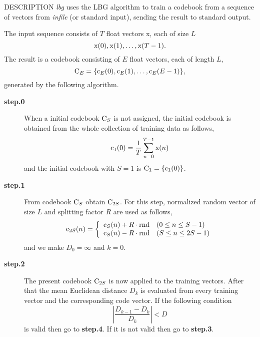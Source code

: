 \begin{qsection}{DESCRIPTION}
{\em lbg} uses the LBG algorithm to train a codebook 
from a sequence of vectors from {\em infile} (or standard input), 
sending the result to standard output.

The input sequence consists of $T$ float vectors {\boldmath x}, 
each of size $L$
\begin{displaymath} 
\mbox{\boldmath x}(0), \mbox{\boldmath x}(1), \ldots, \mbox{\boldmath x}(T-1). 
\end{displaymath}
The result is a codebook consisting of $E$ float vectors, 
each of length $L$,
\begin{displaymath}
\mbox{\boldmath C}_E =\{ \mbox{\boldmath c}_E(0), \mbox{\boldmath c}_E(1), 
\ldots, \mbox{\boldmath c}_E(E-1) \}, 
\end{displaymath}
generated by the following algorithm.

\begin{description}
\item[\bf step.0~~~]
When a initial codebook $\mbox{\boldmath C}_S$ is not assigned,
the initial codebook is obtained from the whole collection of
training data as follows,
\begin{displaymath}
\mbox{\boldmath c}_1(0) = \frac{1}{T} \sum_{n=0}^{T-1} \mbox{\boldmath x}(n)
\end{displaymath}
and the initial codebook with $S = 1$ is $\mbox{\boldmath C}_1 = \{ \mbox{\boldmath c}_1(0) \}$.

\item[\bf step.1~~~]
From codebook $\mbox{\boldmath C}_{S}$ obtain $\mbox{\boldmath C}_{2S}$.
For this step, normalized random vector of size $L$ and splitting factor
$R$ are used as follows,
\begin{displaymath}
\mbox{\boldmath c}_{2S}(n)=\left\{ \begin{array}{ll}
\mbox{\boldmath c}_S(n) + R \cdot \mbox{\boldmath rnd} & ( 0 \le n \le S-1 ) \\
\mbox{\boldmath c}_S(n) - R \cdot \mbox{\boldmath rnd} & ( S \le n \le 2S-1 )
\end{array}\right.
\end{displaymath}
and we make $D_0 = \infty$ and $k = 0$.

\item[\bf step.2~~~]
The present codebook $\mbox{\boldmath C}_{2S}$ is now applied
to the training vectors.
After that the mean Euclidean distance $D_k$ is evaluated
from every training vector and the corresponding code vector.
If the following condition 
\begin{displaymath}
|\frac{D_{k-1}-D_{k}}{D_{k}}| < D
\end{displaymath}
is valid then go to {\bf step.4}.
If it is not valid then go to {\bf step.3}.


\end{description}
\end{qsection}
